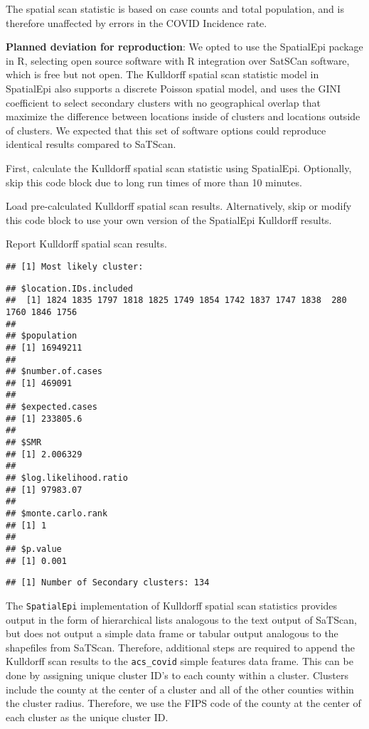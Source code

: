 \documentclass[
]{article}
\begin{document}
The spatial scan statistic is based on case counts and total population,
and is therefore unaffected by errors in the COVID Incidence rate.

\textbf{Planned deviation for reproduction}: We opted to use the
SpatialEpi package in R, selecting open source software with R
integration over SatSCan software, which is free but not open. The
Kulldorff spatial scan statistic model in SpatialEpi also supports a
discrete Poisson spatial model, and uses the GINI coefficient to select
secondary clusters with no geographical overlap that maximize the
difference between locations inside of clusters and locations outside of
clusters. We expected that this set of software options could reproduce
identical results compared to SaTScan.

First, calculate the Kulldorff spatial scan statistic using SpatialEpi.
Optionally, skip this code block due to long run times of more than 10
minutes.

Load pre-calculated Kulldorff spatial scan results. Alternatively, skip
or modify this code block to use your own version of the SpatialEpi
Kulldorff results.

Report Kulldorff spatial scan results.

\begin{verbatim}
## [1] Most likely cluster:
\end{verbatim}

\begin{verbatim}
## $location.IDs.included
##  [1] 1824 1835 1797 1818 1825 1749 1854 1742 1837 1747 1838  280 1760 1846 1756
## 
## $population
## [1] 16949211
## 
## $number.of.cases
## [1] 469091
## 
## $expected.cases
## [1] 233805.6
## 
## $SMR
## [1] 2.006329
## 
## $log.likelihood.ratio
## [1] 97983.07
## 
## $monte.carlo.rank
## [1] 1
## 
## $p.value
## [1] 0.001
\end{verbatim}

\begin{verbatim}
## [1] Number of Secondary clusters: 134
\end{verbatim}

The \texttt{SpatialEpi} implementation of Kulldorff spatial scan
statistics provides output in the form of hierarchical lists analogous
to the text output of SaTScan, but does not output a simple data frame
or tabular output analogous to the shapefiles from SaTScan. Therefore,
additional steps are required to append the Kulldorff scan results to
the \texttt{acs\_covid} simple features data frame. This can be done by
assigning unique cluster ID's to each county within a cluster. Clusters
include the county at the center of a cluster and all of the other
counties within the cluster radius. Therefore, we use the FIPS code of
the county at the center of each cluster as the unique cluster ID.
\end{document}
